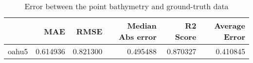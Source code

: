 \begin{table}[h!]
\caption{Error between the point bathymetry and ground-truth data}
\label{tab:oahu5_lidar_error}
\begin{tabular}{lrrrrr}
\toprule
 & MAE & RMSE & Median Abs error & R2 Score & Average Error \\
\midrule
oahu5 & 0.614936 & 0.821300 & 0.495488 & 0.870327 & 0.410845 \\
\bottomrule
\end{tabular}
\end{table}

